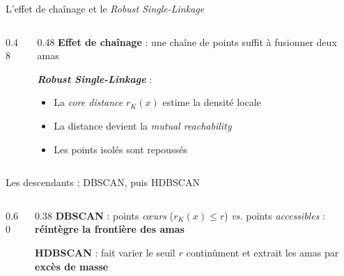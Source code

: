 \begin{frame}{L'effet de chaînage et le \emph{Robust Single-Linkage}}
    \begin{columns}[c, onlytextwidth]
        \begin{column}{0.48\textwidth}
            \begin{center}
                
            \end{center}
        \end{column}
        \begin{column}{0.48\textwidth}
            \textbf{Effet de chaînage} : une chaîne de points suffit à fusionner deux amas

            \vspace{0.4cm}
            \textbf{\emph{Robust Single-Linkage}}  :
            \begin{itemize}
                \setlength{\itemsep}{6pt}
                \item La \emph{core distance} $r_K(x)$ estime la densité locale
                \item La distance devient la \emph{mutual reachability}
                \item Les points isolés sont repoussés
            \end{itemize}
        \end{column}
    \end{columns}
\end{frame}

\begin{frame}{Les descendants : DBSCAN, puis HDBSCAN}
    \begin{columns}[c, onlytextwidth]
        \begin{column}{0.60\textwidth}
            \begin{center}
                
            \end{center}
        \end{column}
        \begin{column}{0.38\textwidth}
            \small
            \textbf{DBSCAN}  : points \emph{cœurs} ($r_K(x)\le r$) \emph{vs.} points \emph{accessibles} :\\ \textbf{réintègre la frontière des amas}

            \vspace{0.3cm}
            \textbf{HDBSCAN}  : fait varier le seuil $r$ continûment et extrait les amas par \textbf{excès de masse}

            \begin{center}
            \end{center}

        \end{column}
    \end{columns}
\end{frame}

